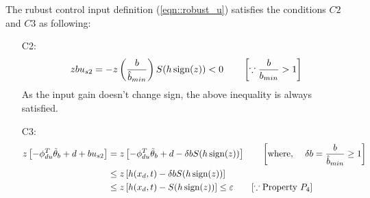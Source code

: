 The rubust control input definition (\ref{eqn::robust_u}) satisfies the
conditions $C2$ and $C3$ as following:
\begin{enumerate}
    \item[C2:]
    \begin{align*}
        z b u_{s2} &= -z \left( \frac{b}{\hat b_{min}} \right) S(h \,\text{sign}(z)) < 0
        \qquad \left[ \because \frac{b}{b_{min}} > 1 \right] \\
    \end{align*}
As the input gain doesn't change sign, the above inequality is always satisfied.

    \item[C3:]
    \begin{align*}
        z \left[ -\phi_{du}^T \tilde \theta_b + d + b u_{s2} \right] &= z \left[ -\phi_{du}^T \tilde \theta_b + d - \delta b S(h \,\text{sign}(z)) \right] \qquad \left[ \text{where, } \quad \delta b = \frac{b}{\hat b_{min}} \geq 1  \right]\\
        &\leq z \left[ h(x_d, t) - \delta b S(h \,\text{sign}(z)) \right]\\
        &\leq z \left[ h(x_d, t) - S(h \,\text{sign}(z)) \right] \leq \varepsilon
        \qquad [\because \text{Property } P_4]
    \end{align*}

\end{enumerate}
